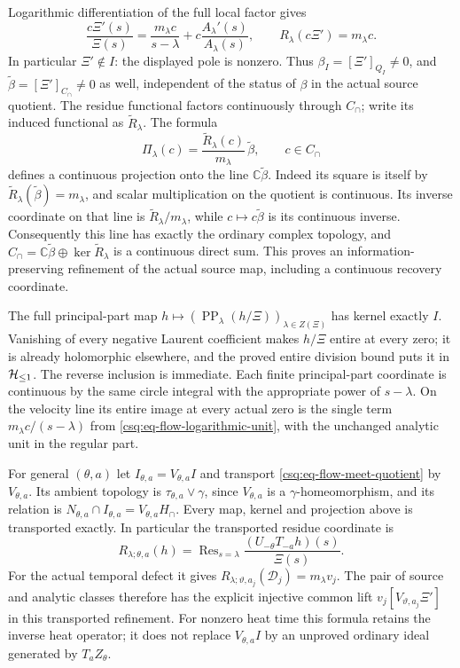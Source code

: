 Logarithmic differentiation of the full local factor gives
\begin{equation}
 \frac{c\Xi'(s)}{\Xi(s)}
 =\frac{m_\lambda c}{s-\lambda}
        +c\frac{A_\lambda'(s)}{A_\lambda(s)},\qquad
 R_\lambda(c\Xi')=m_\lambda c .
 \label{csq:eq-flow-logarithmic-unit}
\end{equation}
In particular $\Xi'\notin I$: the displayed pole is nonzero.
Thus $\beta_I=[\Xi']_{Q_I}\ne0$, and
$\widetilde\beta=[\Xi']_{C_\cap}\ne0$ as well, independent of the
status of $\beta$ in the actual source quotient.
The residue functional factors continuously through $C_\cap$; write
its induced functional as $\widetilde R_\lambda$.
The formula
\begin{equation}
 \Pi_\lambda(c)
  =\frac{\widetilde R_\lambda(c)}{m_\lambda}\,
                  \widetilde\beta,\qquad c\in C_\cap
 \label{csq:eq-flow-meet-projection}
\end{equation}
defines a continuous projection onto the line
$\mathbb C\widetilde\beta$. Indeed its square is itself by
$\widetilde R_\lambda(\widetilde\beta)=m_\lambda$, and scalar
multiplication on the quotient is continuous. Its inverse coordinate
on that line is $\widetilde R_\lambda/m_\lambda$, while
$c\mapsto c\widetilde\beta$ is its continuous inverse.
Consequently this line has exactly the ordinary complex topology,
and
$C_\cap=\mathbb C\widetilde\beta\oplus
\ker\widetilde R_\lambda$ is a continuous direct sum.
This proves an information-preserving refinement of the actual
source map, including a continuous recovery coordinate.

The full principal-part map
$h\mapsto(\operatorname{PP}_\lambda(h/\Xi))_{\lambda\in Z(\Xi)}$
has kernel exactly $I$. Vanishing of every negative Laurent
coefficient makes $h/\Xi$ entire at every zero; it is already
holomorphic elsewhere, and the proved entire division bound
puts it in $\mathcal H_{\leq 1}$. The reverse inclusion is immediate.
Each finite principal-part coordinate is continuous by the same
circle integral with the appropriate power of $s-\lambda$.
On the velocity line its entire image at every actual zero is
the single term $m_\lambda c/(s-\lambda)$ from
\eqref{csq:eq-flow-logarithmic-unit}, with the unchanged analytic
unit in the regular part.

For general $(\theta,a)$ let
$I_{\theta,a}=V_{\theta,a}I$ and transport
\eqref{csq:eq-flow-meet-quotient} by $V_{\theta,a}$.
Its ambient topology is
$\tau_{\theta,a}\vee\gamma$, since $V_{\theta,a}$ is a
$\gamma$-homeomorphism, and its relation is
$N_{\theta,a}\cap I_{\theta,a}=V_{\theta,a}H_\cap$.
Every map, kernel and projection above is transported exactly.
In particular the transported residue coordinate is
\[
 R_{\lambda;\theta,a}(h)
 =\operatorname{Res}_{s=\lambda}
           \frac{(U_{-\theta}T_{-a}h)(s)}{\Xi(s)}.
\]
For the actual temporal defect it gives
$R_{\lambda;\vartheta,a_j}(\mathcal D_j)=m_\lambda v_j$.
The pair of source and analytic classes therefore has the
explicit injective common lift
$v_j[V_{\vartheta,a_j}\Xi']$ in this transported refinement.
For nonzero heat time this formula retains the inverse heat
operator; it does not replace $V_{\theta,a}I$ by an unproved
ordinary ideal generated by $T_aZ_\theta$.

